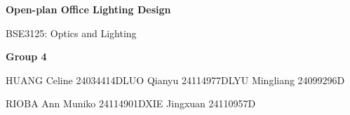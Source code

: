 \documentclass[a4paper,12pt]{article}
\begin{document}
\fontsize{12bp}{15bp}\selectfont
{\centering
{\fontsize{22bp}{26bp}\selectfont\bfseries Open-plan Office Lighting Design\par}
BSE3125: Optics and Lighting\par
{\fontsize{10bp}{12bp}\selectfont\textbf{Group 4}\par
\setlength\parskip{1bp}
HUANG Celine 24034414D\quad LUO Qianyu 24114977D\quad LYU Mingliang 24099296D\par
RIOBA Ann Muniko 24114901D\quad XIE Jingxuan 24110957D\par}}

\clearpage

\clearpage
{\setlength{\parskip}{4bp}
\par}
\clearpage
{\setlength{\parskip}{4bp}
\par}
\clearpage

\clearpage

\clearpage

\clearpage

\clearpage

\end{document}
